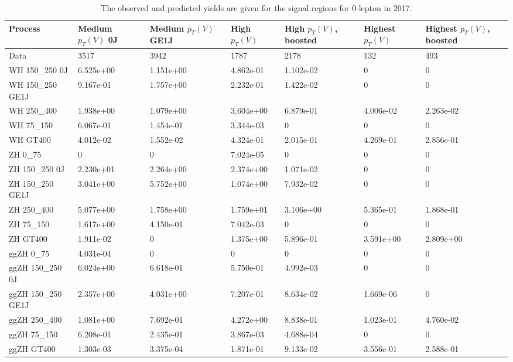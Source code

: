 \begin{table}
\centering
\caption[2017 0-lepton signal selection yields]{
                  The observed and predicted yields are given for the
                  signal regions for 0-lepton in 2017.
                  }
{\footnotesize
\begin{tabularx}{\textwidth}{|X|X|X|X|X|X|X|}
\hline
Process & Medium $p_{T}(V)$ 0J & Medium $p_{T}(V)$ GE1J & High $p_{T}(V)$ & High $p_{T}(V)$, boosted & Highest $p_{T}(V)$ & Highest $p_{T}(V)$, boosted \\
\hline
Data & 3517 & 3942 & 1787 & 2178 & 132 & 493 \\
\hline
WH 150\_250 0J & 6.525e+00 & 1.151e+00 & 4.862e-01 & 1.102e-02 & 0 & 0 \\
WH 150\_250 GE1J & 9.167e-01 & 1.757e+00 & 2.232e-01 & 1.422e-02 & 0 & 0 \\
WH 250\_400 & 1.938e+00 & 1.079e+00 & 3.604e+00 & 6.879e-01 & 4.006e-02 & 2.263e-02 \\
WH 75\_150 & 6.067e-01 & 1.454e-01 & 3.344e-03 & 0 & 0 & 0 \\
WH GT400 & 4.012e-02 & 1.552e-02 & 4.324e-01 & 2.015e-01 & 4.269e-01 & 2.856e-01 \\
ZH 0\_75 & 0 & 0 & 7.024e-05 & 0 & 0 & 0 \\
ZH 150\_250 0J & 2.230e+01 & 2.264e+00 & 2.374e+00 & 1.071e-02 & 0 & 0 \\
ZH 150\_250 GE1J & 3.041e+00 & 5.752e+00 & 1.074e+00 & 7.932e-02 & 0 & 0 \\
ZH 250\_400 & 5.077e+00 & 1.758e+00 & 1.759e+01 & 3.106e+00 & 5.365e-01 & 1.868e-01 \\
ZH 75\_150 & 1.617e+00 & 4.150e-01 & 7.042e-03 & 0 & 0 & 0 \\
ZH GT400 & 1.911e-02 & 0 & 1.375e+00 & 5.896e-01 & 3.591e+00 & 2.809e+00 \\
ggZH 0\_75 & 4.031e-04 & 0 & 0 & 0 & 0 & 0 \\
ggZH 150\_250 0J & 6.024e+00 & 6.618e-01 & 5.750e-01 & 4.992e-03 & 0 & 0 \\
ggZH 150\_250 GE1J & 2.357e+00 & 4.031e+00 & 7.207e-01 & 8.634e-02 & 1.669e-06 & 0 \\
ggZH 250\_400 & 1.081e+00 & 7.692e-01 & 4.272e+00 & 8.838e-01 & 1.023e-01 & 4.760e-02 \\
ggZH 75\_150 & 6.208e-01 & 2.435e-01 & 3.867e-03 & 4.688e-04 & 0 & 0 \\
ggZH GT400 & 1.303e-03 & 3.375e-04 & 1.871e-01 & 9.133e-02 & 3.556e-01 & 2.588e-01 \\

\end{tabularx}}
\end{table}
